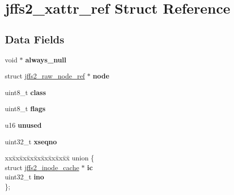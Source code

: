 \hypertarget{structjffs2__xattr__ref}{}\section{jffs2\+\_\+xattr\+\_\+ref Struct Reference}
\label{structjffs2__xattr__ref}
\subsection*{Data Fields}
\begin{DoxyCompactItemize}
\item 
\mbox{\label{structjffs2__xattr__ref_a34052882b1aa3b7741fd5211d11017a2}} 
void $\ast$ {\bfseries always\+\_\+null}
\item 
\mbox{\label{structjffs2__xattr__ref_aa01155bcda26fb3a3d228cf5571787ba}} 
struct \mbox{\hyperlink{structjffs2__raw__node__ref}{jffs2\+\_\+raw\+\_\+node\+\_\+ref}} $\ast$ {\bfseries node}
\item 
\mbox{\label{structjffs2__xattr__ref_a35e32758feeabd833072ce363b9fc668}} 
uint8\+\_\+t {\bfseries class}
\item 
\mbox{\label{structjffs2__xattr__ref_a7e7161a1d467d584d830fff17c759a60}} 
uint8\+\_\+t {\bfseries flags}
\item 
\mbox{\label{structjffs2__xattr__ref_a6867e759cfb6aa0310b09b2708a80b66}} 
u16 {\bfseries unused}
\item 
\mbox{\label{structjffs2__xattr__ref_a9badbb3c940b9d1b8038be5959b3f653}} 
uint32\+\_\+t {\bfseries xseqno}
\item 
\mbox{\label{structjffs2__xattr__ref_a84bcd6c848875a3ae360b3a34f968176}} 
\begin{tabbing}
xx\=xx\=xx\=xx\=xx\=xx\=xx\=xx\=xx\=\kill
union \{\\
\>struct \mbox{\hyperlink{structjffs2__inode__cache}{jffs2\_inode\_cache}} $\ast$ {\bfseries ic}\\
\>uint32\_t {\bfseries ino}\\
\}; \\


\end{tabbing}
\end{DoxyCompactItemize}
